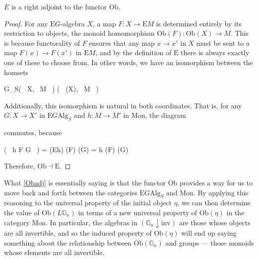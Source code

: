 \begin{prop}\label{Obadj} $E$ is a right adjoint to the functor $\mathrm{Ob}$. 
\end{prop}
\begin{proof}
For any $\mathrm{E}G$-algebra $X$, a map $F: X \to \mathrm{E}M$ is determined entirely by its restriction to objects, the monoid homomorphism $\mathrm{Ob}(F) : \mathrm{Ob}(X) \to M$. This is because functorality of $F$ ensures that any map $x \to x'$ in $X$ must be sent to a map $F(x) \to F(x')$ in $\mathrm{E}M$, and by the definition of $\mathrm{E}$ there is always exactly one of these to choose from. In other words, we have an isomorphism between the homsets
\begin{eq*} G_S( \, X, \, M \, ) \quad \cong \quad {}( \, (X), \, M \, ) \end{eq*}
Additionally, this isomorphism is natural in both coordinates. That is, for any $G: X \to X'$ in $\mathrm{E}G\mathrm{Alg}_S$ and $h : M \to M'$ in $\mathrm{Mon}$, the diagram
\begin{eq*}  \end{eq*}
commutes, because
\begin{eq*} ( \, h \circ F \circ G \, ) \quad = \quad {}(Eh) \circ {}(F) \circ {}(G) \quad = \quad h \circ {}(F) \circ {}(G) \end{eq*}
Therefore, $\mathrm{Ob} \dashv \mathrm{E}$.
\end{proof}

What \cref{Obadj} is essentially saying is that the functor $\mathrm{Ob}$ provides a way for us to move back and forth between the categories $\mathrm{E}G\mathrm{Alg}_S$ and $\mathrm{Mon}$. By applying this reasoning to the universal property of the initial object $\eta$, we can then determine the value of $\mathrm{Ob}(L\mathbb{G}_n)$ in terms of a new universal property of $\mathrm{Ob}(\eta)$ in the category $\mathrm{Mon}$. In particular, the algebras in $(\mathbb{G}_n \downarrow \mathrm{inv})$ are those whose objects are all invertible, and so the induced property of $\mathrm{Ob}(\eta)$ will end up saying something about the relationship between $\mathrm{Ob}(\mathbb{G}_n)$ and groups --- those monoids whose elements are all invertible.

